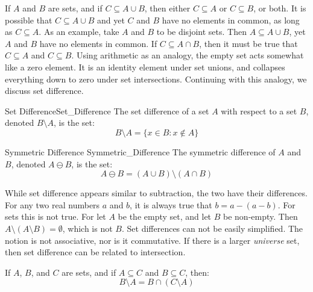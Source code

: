 \documentclass[crop=false,class=book,oneside]{standalone}
\begin{document}
            If $A$ and $B$ are sets, and if
            $C\subseteq{A}\cup{B}$, then
            either $C\subseteq{A}$ or $C\subseteq{B}$, or both.
            It is possible that $C\subseteq{A}\cup{B}$ and yet
            $C$ and $B$ have no elements in common, as long
            as $C\subseteq{A}$. As an example,
            take $A$ and $B$ to be disjoint sets. Then
            $A\subseteq{A}\cup{B}$, yet $A$ and $B$ have no
            elements in common. If $C\subseteq{A}\cap{B}$, then
            it must be true that $C\subseteq{A}$ and
            $C\subseteq{B}$.
            Using arithmetic as an analogy, the empty set
            acts somewhat like a zero element. It is an identity
            element under set unions, and collapses everything
            down to zero under set intersections. Continuing
            with this analogy, we discuss set difference.
            \begin{ldefinition}{Set Difference}{Set_Difference}
                The set difference of a set $A$ with respect to
                a set $B$, denoted $B\setminus{A}$, is the set:
                \begin{equation}
                    B\setminus{A}=\{x\in{B}:x\notin{A}\}
                \end{equation}
            \end{ldefinition}
            \begin{ldefinition}{Symmetric Difference}
                  {Symmetric_Difference}
                The symmetric difference of $A$ and $B$, denoted
                $A\ominus{B}$, is the set:
                \begin{equation}
                    A\ominus{B}
                    =(A\cup{B})\setminus(A\cap{B})
                \end{equation}
            \end{ldefinition}
            While set difference appears similar to subtraction,
            the two have their differences. For any two real
            numbers $a$ and $b$, it is always true that
            $b=a-(a-b)$. For sets this is not true. For let $A$
            be the empty set, and let $B$ be non-empty.
            Then $A\setminus(A\setminus{B})=\emptyset$, which
            is not $B$. Set differences can not be easily
            simplified. The notion is not associative, nor is it
            commutative. If there is a larger \textit{universe}
            set, then set difference can be related to
            intersection.
            \begin{theorem}
                \label{thm:Set_Difference_As_Intersection}%
                If $A$, $B$, and $C$ are sets, and if
                $A\subseteq{C}$ and $B\subseteq{C}$, then:
                \begin{equation}
                    B\setminus{A}=B\cap(C\setminus{A})
                \end{equation}
            \end{theorem}
\end{document}
